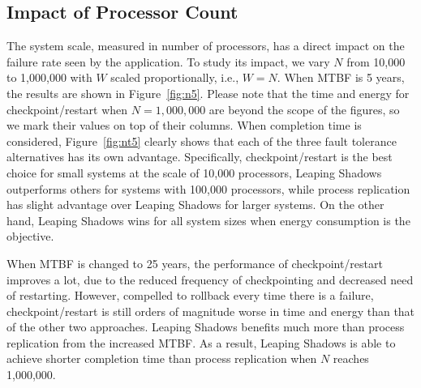\subsection{Impact of Processor Count}
\label{eval_processor}
The system scale, measured in number of processors, has a direct impact on the failure rate seen by the application. To study its impact, we vary $N$ from 10,000 to 1,000,000 with $W$ scaled proportionally, i.e., $W=N$. When MTBF is 5 years, the results are shown in Figure~\ref{fig:n5}. Please note that the time and energy for checkpoint/restart when $N=1,000,000$ are beyond the scope of the figures, so we mark their values on top of their columns. When completion time is considered, Figure~\ref{fig:nt5} clearly shows that each of the three fault tolerance alternatives has its own advantage. Specifically, checkpoint/restart is the best choice for small systems at the scale of 10,000 processors, Leaping Shadows outperforms others for systems with 100,000 processors, while process replication has slight advantage over Leaping Shadows for larger systems. On the other hand, Leaping Shadows wins for all system sizes when energy consumption is the objective. 

When MTBF is changed to 25 years, the performance of checkpoint/restart improves a lot, due to the reduced frequency of checkpointing and decreased need of restarting. However, compelled to rollback every time there is a failure, checkpoint/restart is still orders of magnitude worse in time and energy than that of the other two approaches. Leaping Shadows benefits much more than process replication from the increased MTBF. As a result, Leaping Shadows is able to achieve shorter completion time than process replication when $N$ reaches 1,000,000.

